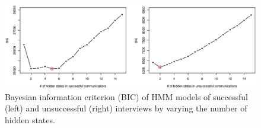 \begin{figure}
\centering
\includegraphics[width=1.0\textwidth]{figures/bic-vs-hidden-states.eps}
\caption{Bayesian information criterion (BIC) of HMM models of successful (left) and unsuccessful (right) interviews by varying the number of hidden states.}
\label{fig:bic}
\end{figure}

